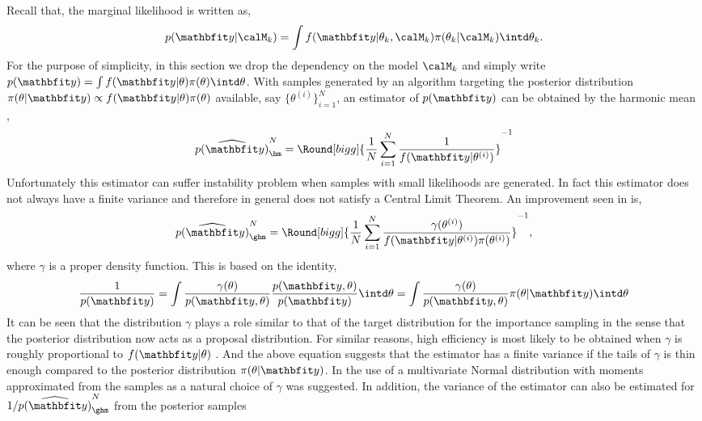 Recall that, the marginal likelihood is written as,
\begin{equation*}
  p(\data|\calM_k) = \int
  f(\data|\theta_k,\calM_k)\pi(\theta_k|\calM_k)\intd\theta_k.
\end{equation*}
For the purpose of simplicity, in this section we drop the dependency on the
model $\calM_k$ and simply write $p(\data) = \int
f(\data|\theta)\pi(\theta)\intd\theta$. With samples generated by an \mcmc
algorithm targeting the posterior distribution $\pi(\theta|\data) \propto
f(\data|\theta) \pi(\theta)$ available, say $\{\theta^{(i)}\}_{i=1}^N$, an
estimator of $p(\data)$ can be obtained by the harmonic mean
\cite{Newton:1994wm},
\begin{equation}
  \widehat{p(\data)}_{\hm}^N =
  \Round[bigg]{\frac{1}{N}\sum_{i=1}^N\frac{1}{f(\data|\theta^{(i)})}}^{-1}
\end{equation}
Unfortunately this estimator can suffer instability problem when samples with
small likelihoods are generated. In fact this estimator does not always have a
finite variance and therefore in general does not satisfy a Central Limit
Theorem. An improvement seen in \cite{Kass:1995vb} is,
\begin{equation}
  \widehat{p(\data)}_{\ghm}^N = \Round[bigg]{
    \frac{1}{N}\sum_{i=1}^N
    \frac{\gamma(\theta^{(i)})}{f(\data|\theta^{(i)})\pi(\theta^{(i)})}}^{-1},
\end{equation}
where $\gamma$ is a proper density function. This is based on the identity,
\begin{equation}
  \frac{1}{p(\data)}
  = \int \frac{\gamma(\theta)}{p(\data,\theta)}
  \frac{p(\data,\theta)}{p(\data)} \intd \theta
  = \int \frac{\gamma(\theta)}{p(\data,\theta)} \pi(\theta|\data) \intd \theta
\end{equation}
It can be seen that the distribution $\gamma$ plays a role similar to that of
the target distribution for the importance sampling in the sense that the
posterior distribution now acts as a proposal distribution. For similar
reasons, high efficiency is most likely to be obtained when $\gamma$ is
roughly proportional to $f(\data|\theta)$ \cite{Kass:1995vb}. And the above
equation suggests that the estimator has a finite variance if the tails of
$\gamma$ is thin enough compared to the posterior distribution
$\pi(\theta|\data)$. In \cite{Gelfand:1994ux} the use of a multivariate Normal
distribution with moments approximated from the samples as a natural choice of
$\gamma$ was suggested. In addition, the variance of the estimator can also be
estimated for $1/\widehat{p(\data)}_{\ghm}^N$ from the posterior samples
